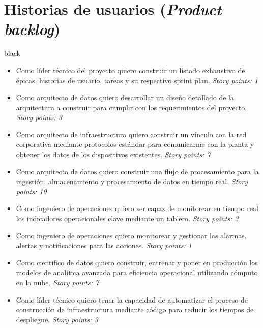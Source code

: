 \documentclass[11pt]{charter}
\begin{document}
\section{Historias de usuarios (\textit{Product backlog})}
\label{sec:backlog}
\begin{consigna}{black}
\begin{itemize}
\item Como líder técnico del proyecto quiero construir un listado exhaustivo de épicas, historias de usuario, tareas y su respectivo sprint plan. \textit{Story points: 1}
\item Como arquitecto de datos quiero desarrollar un diseño detallado de la arquitectura a construir para cumplir con los requerimientos del proyecto. \textit{Story points: 3}
\item Como arquitecto de infraestructura quiero construir un vínculo con la red corporativa mediante protocolos estándar para comunicarme con la planta y obtener los datos de los dispositivos existentes. \textit{Story points: 7}
\item Como arquitecto de datos quiero construir una flujo de procesamiento para la ingestión, almacenamiento y procesamiento de datos en tiempo real. \textit{Story points: 10}
\item Como ingeniero de operaciones quiero ser capaz de monitorear en tiempo real los indicadores operacionales clave mediante un tablero. \textit{Story points: 3}
\item Como ingeniero de operaciones quiero monitorear y gestionar las alarmas, alertas y notificaciones para las acciones. \textit{Story points: 1}
\item Como científico de datos quiero construir, entrenar y poner en producción los modelos de analítica avanzada para eficiencia operacional utilizando cómputo en la nube. \textit{Story points: 7}
\item Como líder técnico quiero tener la capacidad de automatizar el proceso de construcción de infraestructura mediante código para reducir los tiempos de despliegue. \textit{Story points: 3}
\end{itemize}

\end{consigna}
\end{document}
